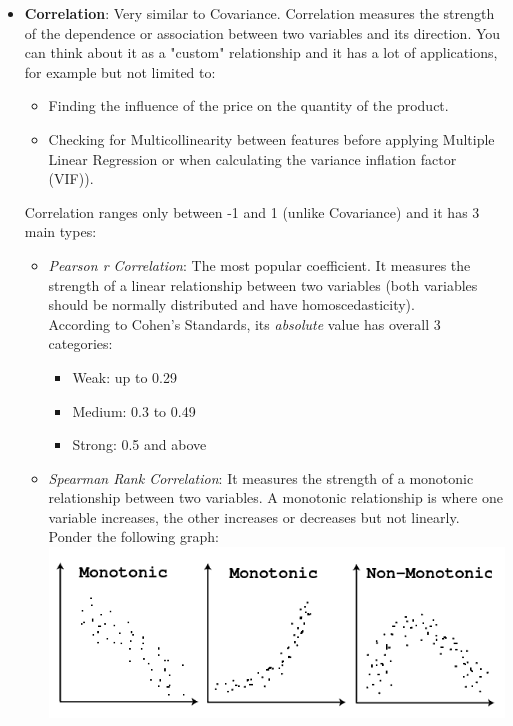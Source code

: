 \documentclass[11pt, twocolumn]{article}
\begin{document}
\begin{itemize}
\item \textbf{Correlation}:
Very similar to Covariance. Correlation measures the {\color{blue}strength} of the dependence or association between two variables and its {\color{blue}direction}. You can think about it as a "custom" relationship and it has a lot of applications, for example but not limited to:
\begin{itemize}
 \item Finding the influence of the price on the quantity of the product.
 \item Checking for Multicollinearity between features before applying Multiple Linear Regression or when calculating the variance inflation factor (VIF)).
 \end{itemize}
Correlation ranges only between -1 and 1 (unlike Covariance) and it has 3 main types:
\begin{itemize}
\item \textit{Pearson r Correlation}:
The most popular coefficient. It measures the strength of a {\color{blue}linear} relationship between two variables (both variables should be normally distributed and have homoscedasticity).\\
According to Cohen's Standards, its \textit{absolute} value has overall 3 categories:
\begin{itemize}
  \item Weak: up to 0.29
  \item Medium: 0.3 to 0.49
  \item Strong: 0.5 and above
\end{itemize}
\end{itemize}

\begin{itemize}
\item \textit{Spearman Rank Correlation}:
It measures the strength of a {\color{blue}monotonic} relationship between two variables. A monotonic relationship is where one variable increases, the other increases or decreases but not linearly. Ponder the following graph:
\includegraphics[width=\linewidth,keepaspectratio]{figs/monotonic.png}
\end{itemize}


\end{itemize}
\end{document}
